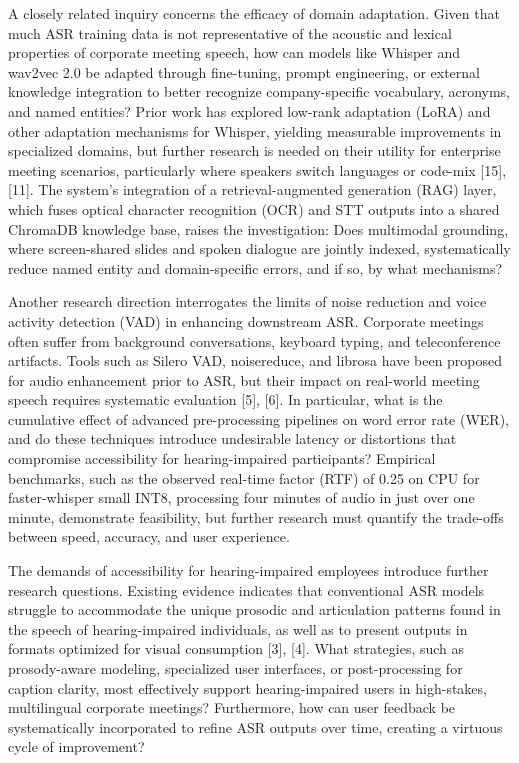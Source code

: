 \documentclass[12pt,a4paper]{article}
\begin{document}
A closely related inquiry concerns the efficacy of domain adaptation. Given that much ASR training data is not representative of the acoustic and lexical properties of corporate meeting speech, how can models like Whisper and wav2vec 2.0 be adapted through fine-tuning, prompt engineering, or external knowledge integration to better recognize company-specific vocabulary, acronyms, and named entities? Prior work has explored low-rank adaptation (LoRA) and other adaptation mechanisms for Whisper, yielding measurable improvements in specialized domains, but further research is needed on their utility for enterprise meeting scenarios, particularly where speakers switch languages or code-mix [15], [11]. The system’s integration of a retrieval-augmented generation (RAG) layer, which fuses optical character recognition (OCR) and STT outputs into a shared ChromaDB knowledge base, raises the investigation: Does multimodal grounding, where screen-shared slides and spoken dialogue are jointly indexed, systematically reduce named entity and domain-specific errors, and if so, by what mechanisms?


Another research direction interrogates the limits of noise reduction and voice activity detection (VAD) in enhancing downstream ASR. Corporate meetings often suffer from background conversations, keyboard typing, and teleconference artifacts. Tools such as Silero VAD, noisereduce, and librosa have been proposed for audio enhancement prior to ASR, but their impact on real-world meeting speech requires systematic evaluation [5], [6]. In particular, what is the cumulative effect of advanced pre-processing pipelines on word error rate (WER), and do these techniques introduce undesirable latency or distortions that compromise accessibility for hearing-impaired participants? Empirical benchmarks, such as the observed real-time factor (RTF) of 0.25 on CPU for faster-whisper small INT8, processing four minutes of audio in just over one minute, demonstrate feasibility, but further research must quantify the trade-offs between speed, accuracy, and user experience.


The demands of accessibility for hearing-impaired employees introduce further research questions. Existing evidence indicates that conventional ASR models struggle to accommodate the unique prosodic and articulation patterns found in the speech of hearing-impaired individuals, as well as to present outputs in formats optimized for visual consumption [3], [4]. What strategies, such as prosody-aware modeling, specialized user interfaces, or post-processing for caption clarity, most effectively support hearing-impaired users in high-stakes, multilingual corporate meetings? Furthermore, how can user feedback be systematically incorporated to refine ASR outputs over time, creating a virtuous cycle of improvement?
\end{document}
